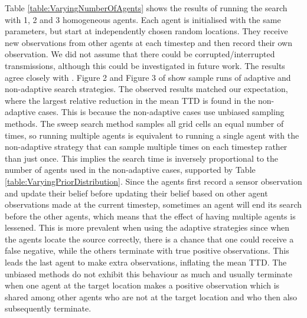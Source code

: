 Table \ref{table:VaryingNumberOfAgents} shows the results of running the search with 1, 2 and 3 homogeneous agents. Each agent is initialised with the same parameters, but start at independently chosen random locations. They receive new observations from other agents at each timestep and then record their own observation. We did not assume that there could be corrupted/interrupted transmissions, although this could be investigated in future work. The results agree closely with \cite{Chung2008Multi-agentFramework}. Figure 2 and Figure 3 of \cite{Chung2008Multi-agentFramework} show sample runs of adaptive and non-adaptive search strategies. The observed results matched our expectation, where the largest relative reduction in the mean TTD is found in the non-adaptive cases. This is because the non-adaptive cases use unbiased sampling methods. The sweep search method samples all grid cells an equal number of times, so running multiple agents is equivalent to running a single agent with the non-adaptive strategy that can sample multiple times on each timestep rather than just once. This implies the search time is inversely proportional to the number of agents used in the non-adaptive cases, supported by Table \ref{table:VaryingPriorDistribution}. Since the agents first record a sensor observation and update their belief before updating their belief based on other agent observations made at the current timestep, sometimes an agent will end its search before the other agents, which means that the effect of having multiple agents is lessened. This is more prevalent when using the adaptive strategies since when the agents locate the source correctly, there is a chance that one could receive a false negative, while the others terminate with true positive observations. This leads the last agent to make extra observations, inflating the mean TTD. The unbiased methods do not exhibit this behaviour as much and usually terminate when one agent at the target location makes a positive observation which is shared among other agents who are not at the target location and who then also subsequently terminate.

